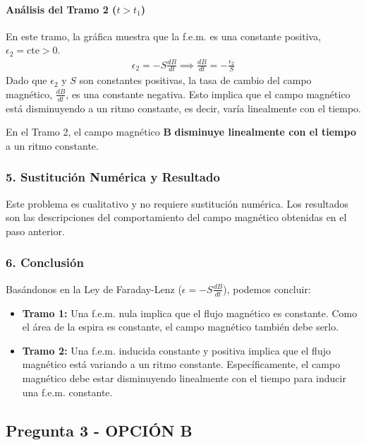 \paragraph*{Análisis del Tramo 2 ($t > t_1$)}
En este tramo, la gráfica muestra que la f.e.m. es una constante positiva, $\epsilon_2 = \text{cte} > 0$.
\begin{gather}
    \epsilon_2 = -S \frac{dB}{dt} \implies \frac{dB}{dt} = -\frac{\epsilon_2}{S}
\end{gather}
Dado que $\epsilon_2$ y $S$ son constantes positivas, la tasa de cambio del campo magnético, $\frac{dB}{dt}$, es una constante negativa. Esto implica que el campo magnético está disminuyendo a un ritmo constante, es decir, varía linealmente con el tiempo.
\begin{cajaresultado}
    En el Tramo 2, el campo magnético $\boldsymbol{B}$ \textbf{disminuye linealmente con el tiempo} a un ritmo constante.
\end{cajaresultado}

\subsubsection*{5. Sustitución Numérica y Resultado}
Este problema es cualitativo y no requiere sustitución numérica. Los resultados son las descripciones del comportamiento del campo magnético obtenidas en el paso anterior.

\subsubsection*{6. Conclusión}
\begin{cajaconclusion}
    Basándonos en la Ley de Faraday-Lenz ($\epsilon = -S \frac{dB}{dt}$), podemos concluir:
    \begin{itemize}
        \item \textbf{Tramo 1:} Una f.e.m. nula implica que el flujo magnético es constante. Como el área de la espira es constante, el campo magnético también debe serlo.
        \item \textbf{Tramo 2:} Una f.e.m. inducida constante y positiva implica que el flujo magnético está variando a un ritmo constante. Específicamente, el campo magnético debe estar disminuyendo linealmente con el tiempo para inducir una f.e.m. constante.
    \end{itemize}
\end{cajaconclusion}

\newpage

\subsection{Pregunta 3 - OPCIÓN B}
\label{subsec:3B_2025_jul_ext}

